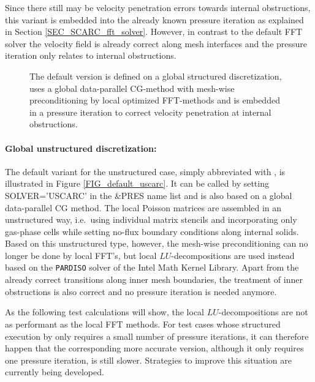 Since there still may be velocity penetration errors towards internal obstructions, this variant is  embedded into the already known pressure iteration as explained in Section \ref{SEC_SCARC_fft_solver}. However, in contrast to the default FFT solver the velocity field is already correct along mesh interfaces and the pressure iteration only relates to internal obstructions.

\begin{figure}[ht]
\centering
\caption{The default  \scarc{} version is defined on a global structured discretization, uses a global data-parallel CG-method with mesh-wise preconditioning by local optimized FFT-methods and is embedded in a pressure iteration to correct velocity penetration at internal obstructions.} 
\label{FIG_default_scarc}
\end{figure}

\newpage   %
\paragraph{Global unstructured discretization:}
The default variant for the unstructured case, simply abbreviated with \uscarc{}, is illustrated in Figure 
\ref{FIG_default_uscarc}. It can be called by setting {\ct SOLVER='USCARC'} in the {\ct \&PRES} name list
and is also based on a global data-parallel CG method. The local Poisson matrices are assembled in an unstructured way, i.e.\  using individual matrix stencils and incorporating only gas-phase cells while setting no-flux boundary conditions along internal solids.
Based on this unstructured type, however, the 
mesh-wise preconditioning can no longer be done by local FFT's, but local $LU$-decompositions are used instead based on the {\tt PARDISO} solver of the Intel\textsuperscript{\textregistered} Math Kernel Library. Apart from the already correct transitions along inner mesh boundaries, the treatment of inner obstructions is also correct and no pressure iteration is needed anymore.

As the following test calculations will show, the local $LU$-decompositions are not as performant as the local FFT methods. For test cases whose structured execution by \scarc{} only requires a small number of pressure iterations, it can therefore happen that the corresponding more accurate \uscarc{} version, although it only requires one pressure iteration, is still slower. 
Strategies to improve this situation are currently being developed.

